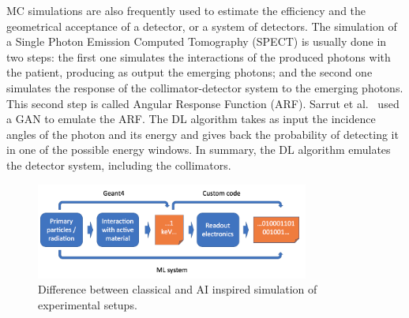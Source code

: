 MC simulations are also frequently used to estimate the efficiency and the geometrical acceptance of a detector, or a  system of detectors. The simulation of a Single Photon Emission Computed Tomography (SPECT) is usually done in two steps: the first one simulates the interactions of the produced photons with the patient, producing as output the emerging photons; and the second one simulates the response of the collimator-detector system to the emerging photons. This second step is called Angular Response Function (ARF).
Sarrut et al.~\cite{Sarrut2018} used a GAN to emulate the ARF. The DL algorithm takes as input the incidence angles of the photon and its energy and gives back the probability of detecting it in one of the possible energy windows. %
In summary, the DL algorithm emulates the detector system, including the collimators.

\begin{figure}[h]
    \centering

    \includegraphics[width=0.8\textwidth]{images/electronics.png}
    \caption{Difference between classical and AI inspired simulation of experimental setups.}
     \label{fig:elec}

\end{figure}


